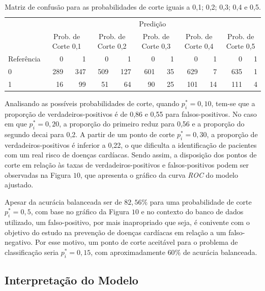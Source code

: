 \documentclass[
  12pt,
]{article}
\begin{document}
\begin{table}[H]

\caption{\label{tab:mat}Matriz de confusão para as probabilidades de corte iguais a 0,1;  0,2;  0,3;  0,4 e  0,5.}
\centering
\fontsize{9}{11}\selectfont
\begin{tabular}[t]{lrrrrrrrrrr}
\toprule
\multicolumn{1}{c}{ } & \multicolumn{10}{c}{Predição} \\
\cmidrule(l{3pt}r{3pt}){2-11}
\multicolumn{1}{c}{ } & \multicolumn{2}{c}{Prob. de Corte 0,1} & \multicolumn{2}{c}{Prob. de Corte 0,2} & \multicolumn{2}{c}{Prob. de Corte 0,3} & \multicolumn{2}{c}{Prob. de Corte 0,4} & \multicolumn{2}{c}{Prob. de Corte 0,5} \\
\cmidrule(l{3pt}r{3pt}){2-3} \cmidrule(l{3pt}r{3pt}){4-5} \cmidrule(l{3pt}r{3pt}){6-7} \cmidrule(l{3pt}r{3pt}){8-9} \cmidrule(l{3pt}r{3pt}){10-11}
Referência & 0 & 1 & 0 & 1 & 0 & 1 & 0 & 1 & 0 & 1\\
\midrule
0 & 289 & 347 & 509 & 127 & 601 & 35 & 629 & 7 & 635 & 1\\
1 & 16 & 99 & 51 & 64 & 90 & 25 & 101 & 14 & 111 & 4\\
\bottomrule
\end{tabular}
\end{table}

\quad Analisando as possíveis probabilidades de corte, quando
\(p_i^* = 0,10\), tem-se que a proporção de verdadeiros-positivos é de
0,86 e 0,55 para falsos-positivos. No caso em que \(p_i^* = 0,20\), a
proporção do primeiro reduz para 0,56 e a proporção do segundo decai
para 0,2. A partir de um ponto de corte \(p_i^*=0,30\), a proporção de
verdadeiros-positivos é inferior a 0,22, o que dificulta a identificação
de pacientes com um real risco de doenças cardíacas. Sendo assim, a
disposição dos pontos de corte em relação às taxas de
verdadeiros-positivos e falsos-positivos podem ser observadas na Figura
\(10\), que apresenta o gráfico da curva \emph{ROC} do modelo ajustado.

\quad Apesar da acurácia balanceada ser de \(82,56\%\) para uma
probabilidade de corte \(p_i^* = 0,5\), com base no gráfico da Figura
\(10\) e no contexto do banco de dados utilizado, um falso-positivo, por
mais inapropriado que seja, é conivente com o objetivo do estudo na
prevenção de doenças cardíacas em relação a um falso-negativo. Por esse
motivo, um ponto de corte aceitável para o problema de classificação
seria \(p_i^* = 0,15\), com aproximadamente \(60\%\) de acurácia
balanceada.

\subsection{Interpretação do Modelo}
\end{document}
